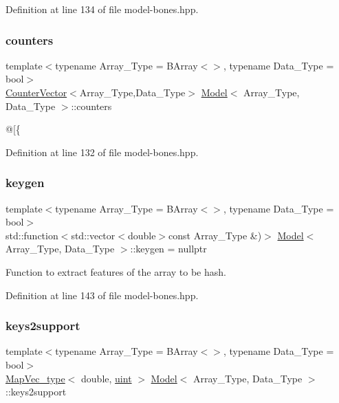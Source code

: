 Definition at line 134 of file model-\/bones.\+hpp.

\mbox{\label{class_model_a1a711382ab0593f3b54ad549746e9149}} 
\subsubsection{\texorpdfstring{counters}{counters}}
{\footnotesize\ttfamily template$<$typename Array\+\_\+\+Type  = B\+Array$<$$>$, typename Data\+\_\+\+Type  = bool$>$ \\
\hyperlink{class_counter_vector}{Counter\+Vector}$<$Array\+\_\+\+Type,Data\+\_\+\+Type$>$ \hyperlink{class_model}{Model}$<$ Array\+\_\+\+Type, Data\+\_\+\+Type $>$\+::counters}



@\mbox{[}\{ 



Definition at line 132 of file model-\/bones.\+hpp.

\mbox{\label{class_model_a087db7c5e2ee47f4353d2e181223dd5a}} 
\subsubsection{\texorpdfstring{keygen}{keygen}}
{\footnotesize\ttfamily template$<$typename Array\+\_\+\+Type  = B\+Array$<$$>$, typename Data\+\_\+\+Type  = bool$>$ \\
std\+::function$<$std\+::vector$<$double$>$const Array\+\_\+\+Type \&)$>$ \hyperlink{class_model}{Model}$<$ Array\+\_\+\+Type, Data\+\_\+\+Type $>$\+::keygen = nullptr}



Function to extract features of the array to be hash. 



Definition at line 143 of file model-\/bones.\+hpp.

\mbox{\label{class_model_a83d72b83e29ccaf09a5a05d2a67d0f05}} 
\subsubsection{\texorpdfstring{keys2support}{keys2support}}
{\footnotesize\ttfamily template$<$typename Array\+\_\+\+Type  = B\+Array$<$$>$, typename Data\+\_\+\+Type  = bool$>$ \\
\hyperlink{typedefs_8hpp_a02ed8dec96bc528c8bc3d8cb3c4674a5}{Map\+Vec\+\_\+type}$<$ double, \hyperlink{typedefs_8hpp_a91ad9478d81a7aaf2593e8d9c3d06a14}{uint} $>$ \hyperlink{class_model}{Model}$<$ Array\+\_\+\+Type, Data\+\_\+\+Type $>$\+::keys2support}



